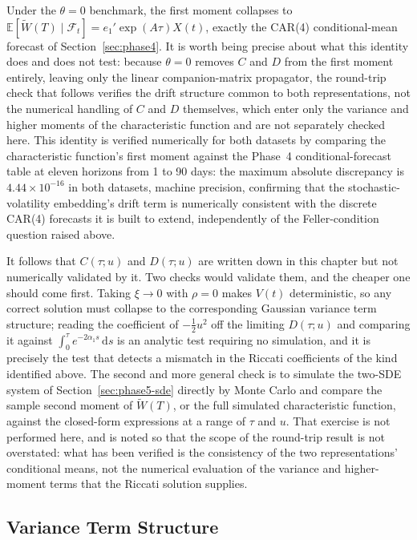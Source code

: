 \documentclass[11pt, a4paper, twoside]{article}
\begin{document}
Under the $\theta=0$ benchmark, the first moment collapses to $\mathbb E[\widetilde W(T)\mid\mathcal F_t] = e_1' \exp(A\tau)X(t)$, exactly the CAR(4) conditional-mean forecast of Section~\ref{sec:phase4}. It is worth being precise about what this identity does and does not test: because $\theta = 0$ removes $C$ and $D$ from the first moment entirely, leaving only the linear companion-matrix propagator, the round-trip check that follows verifies the drift structure common to both representations, not the numerical handling of $C$ and $D$ themselves, which enter only the variance and higher moments of the characteristic function and are not separately checked here. This identity is verified numerically for both datasets by comparing the characteristic function's first moment against the Phase~4 conditional-forecast table at eleven horizons from 1 to 90 days: the maximum absolute discrepancy is $4.44\times 10^{-16}$ in both datasets, machine precision, confirming that the stochastic-volatility embedding's drift term is numerically consistent with the discrete CAR(4) forecasts it is built to extend, independently of the Feller-condition question raised above.

It follows that $C(\tau;u)$ and $D(\tau;u)$ are written down in this chapter but not numerically validated by it. Two checks would validate them, and the cheaper one should come first. Taking $\xi \to 0$ with $\rho = 0$ makes $V(t)$ deterministic, so any correct solution must collapse to the corresponding Gaussian variance term structure; reading the coefficient of $-\tfrac12 u^2$ off the limiting $D(\tau;u)$ and comparing it against $\int_0^\tau e^{-2\alpha_1 s}\,\mathrm ds$ is an analytic test requiring no simulation, and it is precisely the test that detects a mismatch in the Riccati coefficients of the kind identified above. The second and more general check is to simulate the two-SDE system of Section~\ref{sec:phase5-sde} directly by Monte Carlo and compare the sample second moment of $\widetilde W(T)$, or the full simulated characteristic function, against the closed-form expressions at a range of $\tau$ and $u$. That exercise is not performed here, and is noted so that the scope of the round-trip result is not overstated: what has been verified is the consistency of the two representations' conditional means, not the numerical evaluation of the variance and higher-moment terms that the Riccati solution supplies.

\subsection{Variance Term Structure}
\label{sec:phase5-termstructure}
\end{document}
